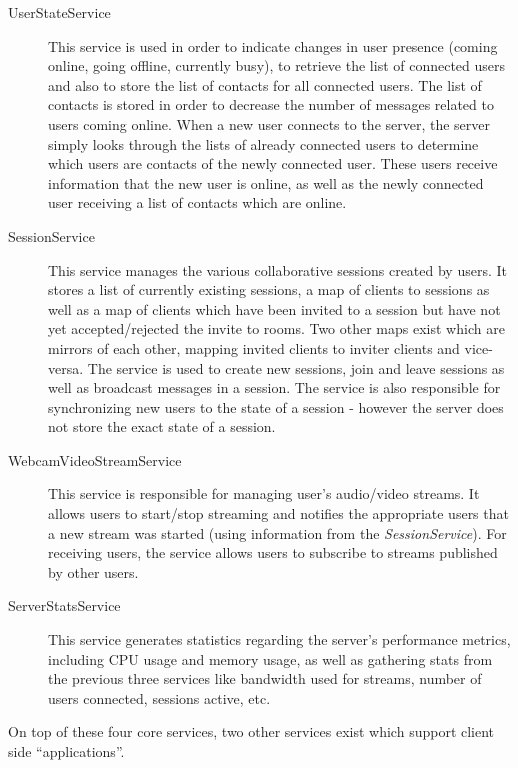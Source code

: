 \begin{description}
	\item[UserStateService] This service is used in order to indicate changes in user presence (coming online, going offline, currently busy), to retrieve the list of connected users and also to store the list of contacts for all connected users. The list of contacts is stored in order to decrease the number of messages related to users coming online. When a new user connects to the server, the server simply looks through the lists of already connected users to determine which users are contacts of the newly connected user. These users receive information that the new user is online, as well as the newly connected user receiving a list of contacts which are online.
	\item[SessionService] This service manages the various collaborative sessions created by users. It stores a list of currently existing sessions, a map of clients to sessions as well as a map of clients which have been invited to a session but have not yet accepted/rejected the invite to rooms. Two other maps exist which are mirrors of each other, mapping invited clients to inviter clients and vice-versa. The service is used to create new sessions, join and leave sessions as well as broadcast messages in a session. The service is also responsible for synchronizing new users to the state of a session - however the server does not store the exact state of a session.
	\item[WebcamVideoStreamService] This service is responsible for managing user's audio/video streams. It allows users to start/stop streaming and notifies the appropriate users that a new stream was started (using information from the \textit{SessionService}). For receiving users, the service allows users to subscribe to streams published by other users.
	\item[ServerStatsService] This service generates statistics regarding the server's performance metrics, including CPU usage and memory usage, as well as gathering stats from the previous three services like bandwidth used for streams, number of users connected, sessions active, etc.
\end{description}

On top of these four core services, two other services exist which support client side ``applications''. 

